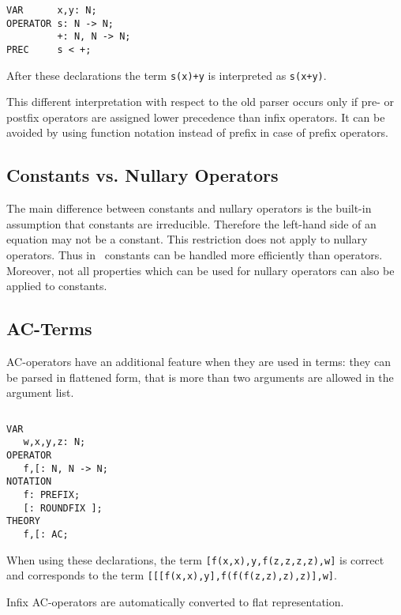 \begin{example} $ $
\begin{verbatim}
VAR      x,y: N;
OPERATOR s: N -> N;
         +: N, N -> N;
PREC     s < +;
\end{verbatim}
{\rm After these declarations the term {\tt s(x)+y} is interpreted as
{\tt s(x+y)}.}
\end{example}

This different interpretation with respect to the old parser occurs only
if pre- or postfix operators are assigned lower precedence than
infix operators. It can be avoided by using function notation instead of prefix
in case of prefix operators.

\subsection{Constants vs. Nullary Operators}
The main difference between constants and nullary operators is the built-in
assumption that constants are irreducible. Therefore the left-hand side
of an equation may not be a constant. This restriction does not apply to
nullary operators. Thus in \redux\ constants can be handled more efficiently
than operators.
Moreover, not all properties which can be used for nullary operators can also
be applied to constants.

\subsection{AC-Terms}
AC-operators have an additional feature when they are used in terms:
they can be parsed in flattened form, that is more than two arguments
are allowed in the argument list.

\begin{example}$ $
\begin{verbatim}
VAR
   w,x,y,z: N;
OPERATOR
   f,[: N, N -> N;
NOTATION
   f: PREFIX;
   [: ROUNDFIX ];
THEORY
   f,[: AC;
\end{verbatim}
{\rm
When using these declarations, the term {\tt [f(x,x),y,f(z,z,z,z),w]}
is correct and corresponds to the term {\tt [[[f(x,x),y],f(f(f(z,z),z),z)],w]}.
}
\end{example}

Infix AC-operators are automatically converted to flat representation.
